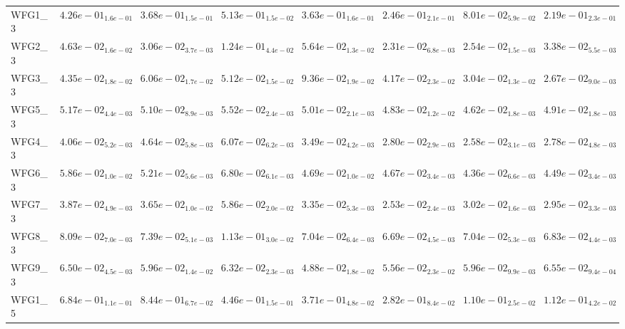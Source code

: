 \documentclass{article}
\begin{document}
\begin{landscape}
\begin{table}
\begin{scriptsize}
\begin{tabular}{llllllll}
WFG1\_3 & $  4.26e-01_{ 1.6e-01}$ & $  3.68e-01_{ 1.5e-01}$ & $  5.13e-01_{ 1.5e-02}$ & $  3.63e-01_{ 1.6e-01}$ & $  2.46e-01_{ 2.1e-01}$ & \cellcolor{gray95}$  8.01e-02_{ 5.9e-02}$ & \cellcolor{gray25}$  2.19e-01_{ 2.3e-01}$ \\
WFG2\_3 & $  4.63e-02_{ 1.6e-02}$ & $  3.06e-02_{ 3.7e-03}$ & $  1.24e-01_{ 4.4e-02}$ & $  5.64e-02_{ 1.3e-02}$ & \cellcolor{gray95}$  2.31e-02_{ 6.8e-03}$ & \cellcolor{gray25}$  2.54e-02_{ 1.5e-03}$ & $  3.38e-02_{ 5.5e-03}$ \\
WFG3\_3 & $  4.35e-02_{ 1.8e-02}$ & $  6.06e-02_{ 1.7e-02}$ & $  5.12e-02_{ 1.5e-02}$ & $  9.36e-02_{ 1.9e-02}$ & $  4.17e-02_{ 2.3e-02}$ & \cellcolor{gray25}$  3.04e-02_{ 1.3e-02}$ & \cellcolor{gray95}$  2.67e-02_{ 9.0e-03}$ \\
WFG5\_3 & $  5.17e-02_{ 4.4e-03}$ & $  5.10e-02_{ 8.9e-03}$ & $  5.52e-02_{ 2.4e-03}$ & $  5.01e-02_{ 2.1e-03}$ & \cellcolor{gray25}$  4.83e-02_{ 1.2e-02}$ & \cellcolor{gray95}$  4.62e-02_{ 1.8e-03}$ & $  4.91e-02_{ 1.8e-03}$ \\
WFG4\_3 & $  4.06e-02_{ 5.2e-03}$ & $  4.64e-02_{ 5.8e-03}$ & $  6.07e-02_{ 6.2e-03}$ & $  3.49e-02_{ 4.2e-03}$ & $  2.80e-02_{ 2.9e-03}$ & \cellcolor{gray95}$  2.58e-02_{ 3.1e-03}$ & \cellcolor{gray25}$  2.78e-02_{ 4.8e-03}$ \\
WFG6\_3 & $  5.86e-02_{ 1.0e-02}$ & $  5.21e-02_{ 5.6e-03}$ & $  6.80e-02_{ 6.1e-03}$ & $  4.69e-02_{ 1.0e-02}$ & $  4.67e-02_{ 3.4e-03}$ & \cellcolor{gray95}$  4.36e-02_{ 6.6e-03}$ & \cellcolor{gray25}$  4.49e-02_{ 3.4e-03}$ \\
WFG7\_3 & $  3.87e-02_{ 4.9e-03}$ & $  3.65e-02_{ 1.0e-02}$ & $  5.86e-02_{ 2.0e-02}$ & $  3.35e-02_{ 5.3e-03}$ & \cellcolor{gray95}$  2.53e-02_{ 2.4e-03}$ & $  3.02e-02_{ 1.6e-03}$ & \cellcolor{gray25}$  2.95e-02_{ 3.3e-03}$ \\
WFG8\_3 & $  8.09e-02_{ 7.0e-03}$ & $  7.39e-02_{ 5.1e-03}$ & $  1.13e-01_{ 3.0e-02}$ & $  7.04e-02_{ 6.4e-03}$ & \cellcolor{gray95}$  6.69e-02_{ 4.5e-03}$ & $  7.04e-02_{ 5.3e-03}$ & \cellcolor{gray25}$  6.83e-02_{ 4.4e-03}$ \\
WFG9\_3 & $  6.50e-02_{ 4.5e-03}$ & $  5.96e-02_{ 1.4e-02}$ & $  6.32e-02_{ 2.3e-03}$ & \cellcolor{gray95}$  4.88e-02_{ 1.8e-02}$ & \cellcolor{gray25}$  5.56e-02_{ 2.3e-02}$ & $  5.96e-02_{ 9.9e-03}$ & $  6.55e-02_{ 9.4e-04}$ \\
WFG1\_5 & $  6.84e-01_{ 1.1e-01}$ & $  8.44e-01_{ 6.7e-02}$ & $  4.46e-01_{ 1.5e-01}$ & $  3.71e-01_{ 4.8e-02}$ & $  2.82e-01_{ 8.4e-02}$ & \cellcolor{gray95}$  1.10e-01_{ 2.5e-02}$ & \cellcolor{gray25}$  1.12e-01_{ 4.2e-02}$ \\

\end{tabular}
\end{scriptsize}
\end{table}
\end{landscape}
\end{document}
